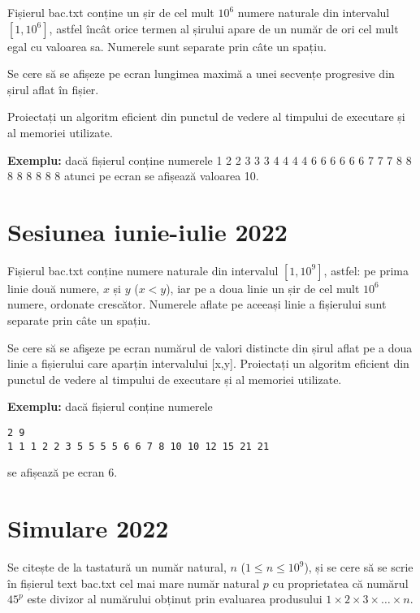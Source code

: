 \documentclass[10pt, a4paper]{article}
\newcommand{\highlight}[1]{{\ttfamily\color{red}#1}}
\begin{document}
\vspace{0.2cm}
\noindent Fișierul \highlight{bac.txt} conține un șir de cel mult \highlight{$10^6$} numere naturale din intervalul \highlight{$[1,10^6]$}, astfel încât orice termen al șirului apare de un număr de ori cel mult egal cu valoarea sa. Numerele sunt separate prin câte un spațiu.

\vspace{0.2cm}
\noindent Se cere să se afișeze pe ecran lungimea maximă a unei secvențe progresive din șirul aflat în fișier.

\vspace{0.2cm}
\noindent Proiectați un algoritm eficient din punctul de vedere al timpului de executare și al memoriei utilizate.

\vspace{0.2cm}
\noindent \textbf{Exemplu:} dacă fișierul conține numerele \highlight{1 2 2 3 3 3 4 4 4 4 6 6 6 6 6 6 7 7 7 8 8 8 8 8 8 8 8} atunci pe ecran se afișează valoarea \highlight{10}.

\section{Sesiunea iunie-iulie 2022}
Fișierul \highlight{bac.txt} conține numere naturale din intervalul \highlight{$[1,10^9]$}, astfel: pe prima linie două numere, \highlight{$x$} și \highlight{$y$} (\highlight{$x < y$}), iar pe a doua linie un șir de cel mult \highlight{$10^6$} numere, ordonate crescător. Numerele aflate pe aceeași linie a fișierului sunt separate prin câte un spațiu.

\vspace{0.2cm}
\noindent Se cere să se afişeze pe ecran numărul de valori distincte din șirul aflat pe a doua linie a fișierului care aparțin intervalului \highlight{[x,y]}. Proiectați un algoritm eficient din punctul de vedere al timpului de executare și al memoriei utilizate.

\vspace{0.2cm}
\noindent \textbf{Exemplu:} dacă fișierul conține numerele
\begin{verbatim}
2 9
1 1 1 2 2 3 5 5 5 5 6 6 7 8 10 10 12 15 21 21
\end{verbatim}
\noindent se afișează pe ecran \highlight{6}.


\section{Simulare 2022}
Se citește de la tastatură un număr natural, \highlight{$n$} (\highlight{$1\leq n\leq 10^9$}), și se cere să se scrie în fișierul text \highlight{bac.txt} cel mai mare număr natural \highlight{$p$} cu proprietatea că numărul \highlight{$45^p$} este divizor al numărului obținut prin evaluarea produsului \highlight{$1\times2\times3\times\dots\times n$}.
\end{document}
